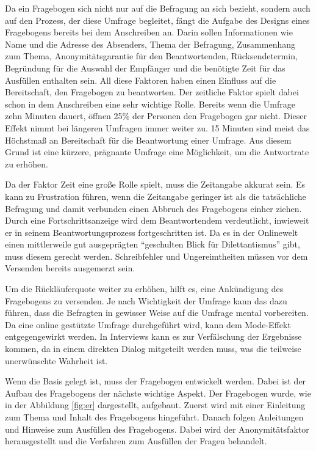 Da ein Fragebogen sich nicht nur auf die Befragung an sich bezieht, sondern auch auf den Prozess, der diese Umfrage begleitet, fängt die Aufgabe des Designs eines Fragebogens bereits bei dem Anschreiben an.
Darin sollen Informationen wie Name und die Adresse des Absenders, Thema der Befragung, Zusammenhang zum Thema, Anonymitätsgarantie für den Beantwortenden, Rücksendetermin, Begründung für die Auswahl der Empfänger und die benötigte Zeit für das Ausfüllen enthalten sein\autocite[S.29]{2003Fragebogen}. %
All diese Faktoren haben einen Einfluss auf die Bereitschaft, den Fragebogen zu beantworten. 
Der zeitliche Faktor spielt dabei schon in dem Anschreiben eine sehr wichtige Rolle. 
Bereits wenn die Umfrage zehn Minuten dauert, öffnen 25\% der Personen den Fragebogen gar nicht.
Dieser Effekt nimmt bei längeren Umfragen immer weiter zu\autocite[S.353]{NFP}. %
15 Minuten sind meist das Höchstmaß an Bereitschaft für die Beantwortung einer Umfrage\autocite[S.37]{2009Fragebogen}. %
Aus diesem Grund ist eine kürzere, prägnante Umfrage eine Möglichkeit, um die Antwortrate zu erhöhen.

Da der Faktor Zeit eine große Rolle spielt, muss die Zeitangabe akkurat sein.
Es kann zu Frustration führen, wenn die Zeitangabe geringer ist als die tatsächliche Befragung und damit verbunden einen Abbruch des Fragebogens einher ziehen. 
Durch eine Fortschrittsanzeige wird dem Beantwortendem verdeutlicht, inwieweit er in seinem Beantwortungsprozess fortgeschritten ist. 
Da es in der Onlinewelt einen mittlerweile gut ausgeprägten \enquote{geschulten Blick für Dilettantismus} gibt, muss diesem gerecht werden.
Schreibfehler und Ungereimtheiten müssen vor dem Versenden bereits ausgemerzt sein\autocite[S.37]{2009Fragebogen}. %

Um die Rückläuferquote weiter zu erhöhen, hilft es, eine Ankündigung des Fragebogens zu versenden. 
Je nach Wichtigkeit der Umfrage kann das dazu führen, dass die Befragten in gewisser Weise auf die Umfrage mental vorbereiten\autocite[S.38]{Umfragenforschung}.
Da eine online gestützte Umfrage durchgeführt wird, kann dem Mode-Effekt entgegengewirkt werden. In Interviews kann es zur Verfälschung der Ergebnisse kommen, da in einem direkten Dialog mitgeteilt werden muss, was die teilweise unerwünschte Wahrheit ist\autocite[S.163]{Umfragenforschung}.

Wenn die Basis gelegt ist, muss der Fragebogen entwickelt werden. 
Dabei ist der Aufbau des Fragebogens der nächste wichtige Aspekt.  
Der Fragebogen wurde, wie in der Abbildung \ref{fig:er} dargestellt, aufgebaut. 
Zuerst wird mit einer Einleitung zum Thema und Inhalt des Fragebogens hingeführt. 
Danach folgen Anleitungen und Hinweise zum Ausfüllen des Fragebogens.
Dabei wird der Anonymitätsfaktor herausgestellt und die Verfahren zum Ausfüllen der Fragen behandelt.

